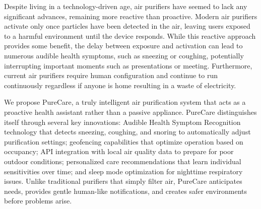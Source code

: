 \documentclass[conference]{IEEEtran}
\begin{document}
        Despite living in a technology-driven age, air purifiers have seemed to lack any significant advances, remaining more reactive than proactive. Modern air purifiers activate only once particles have been detected in the air, leaving users exposed to a harmful environment until the device responds. While this reactive approach provides some benefit, the delay between exposure and activation can lead to numerous audible health symptoms, such as sneezing or coughing, potentially interrupting important moments such as presentations or meeting. Furthermore, current air purifiers require human configuration and continue to run continuously regardless if anyone is home resulting in a waste of electricity.

        We propose PureCare, a truly intelligent air purification system that acts as a proactive health assistant rather than a passive appliance. PureCare distinguishes itself through several key innovations: Audible Health Symptom Recognition technology that detects sneezing, coughing, and snoring to automatically adjust purification settings; geofencing capabilities that optimize operation based on occupancy; API integration with local air quality data to prepare for poor outdoor conditions; personalized care recommendations that learn individual sensitivities over time; and sleep mode optimization for nighttime respiratory issues. Unlike traditional purifiers that simply filter air, PureCare anticipates needs, provides gentle human-like notifications, and creates safer environments before problems arise.
\newpage
\end{document}
